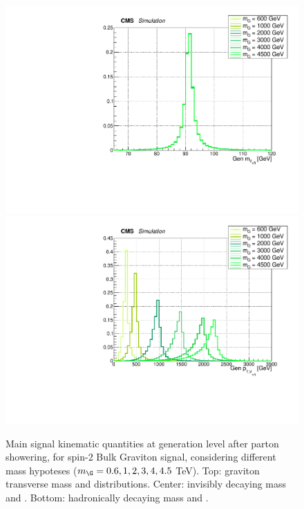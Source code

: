\begin{figure}[!htb]
\begin{center}
     \includegraphics[width=.495\textwidth]{Gen_v9/XZZInv_g_VHadMass.pdf}%
     \includegraphics[width=.495\textwidth]{Gen_v9/XZZInv_g_VHadPt.pdf}%
   \end{center}
   \caption{Main signal kinematic quantities at generation level after parton showering, for spin-2 Bulk Graviton signal, considering different mass hypoteses ($m_{\G} = 0.6, 1, 2, 3, 4, 4.5$ TeV). Top: graviton transverse mass and \pt distributions. Center: invisibly decaying \Z mass and \pt. Bottom: hadronically decaying \Z mass and \pt.}
   \label{fig:genGravSignal1}
 \end{figure}


